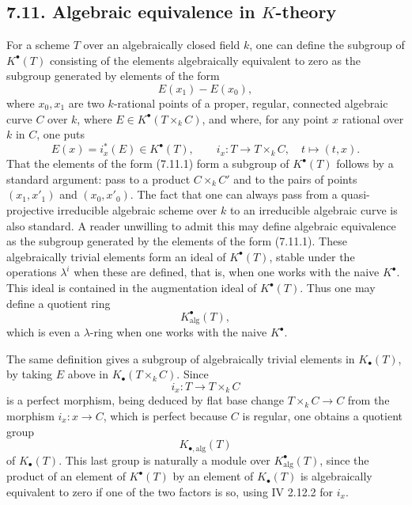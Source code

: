 \documentclass[11pt]{article}
\begin{document}
\subsection*{7.11. Algebraic equivalence in \(K\)-theory}
For a scheme \(T\) over an algebraically closed field \(k\), one can define the subgroup of \(K^\bullet(T)\) consisting of the elements algebraically equivalent to zero as the subgroup generated by elements of the form
\begin{equation}\tag{7.11.1}
  E(x_1)-E(x_0),
\end{equation}
where \(x_0,x_1\) are two \(k\)-rational points of a proper, regular, connected algebraic curve \(C\) over \(k\), where \(E\in K^\bullet(T\times_k C)\), and where, for any point \(x\) rational over \(k\) in \(C\), one puts
\[
  E(x)=i_x^*(E)\in K^\bullet(T),\qquad
  i_x:T\longrightarrow T\times_k C,\quad t\mapsto(t,x).
\]
That the elements of the form (7.11.1) form a subgroup of \(K^\bullet(T)\) follows by a standard argument: pass to a product \(C\times_k C'\) and to the pairs of points \((x_1,x'_1)\) and \((x_0,x'_0)\). The fact that one can always pass from a quasi-projective irreducible algebraic scheme over \(k\) to an irreducible algebraic curve is also standard. A reader unwilling to admit this may define algebraic equivalence as the subgroup generated by the elements of the form (7.11.1). These algebraically trivial elements form an ideal of \(K^\bullet(T)\), stable under the operations \(\lambda^i\) when these are defined, that is, when one works with the naive \(K^\bullet\). This ideal is contained in the augmentation ideal of \(K^\bullet(T)\). Thus one may define a quotient ring
\begin{equation}\tag{7.11.2}
  K^\bullet_{\mathrm{alg}}(T),
\end{equation}
which is even a \(\lambda\)-ring when one works with the naive \(K^\bullet\).

The same definition gives a subgroup of algebraically trivial elements in \(K_\bullet(T)\), by taking \(E\) above in \(K_\bullet(T\times_k C)\). Since
\[
  i_x:T\to T\times_k C
\]
is a perfect morphism, being deduced by flat base change \(T\times_k C\to C\) from the morphism \(i_x:x\to C\), which is perfect because \(C\) is regular, one obtains a quotient group
\begin{equation}\tag{7.11.3}
  K_{\bullet,\mathrm{alg}}(T)
\end{equation}
of \(K_\bullet(T)\). This last group is naturally a module over \(K^\bullet_{\mathrm{alg}}(T)\), since the product of an element of \(K^\bullet(T)\) by an element of \(K_\bullet(T)\) is algebraically equivalent to zero if one of the two factors is so, using IV 2.12.2 for \(i_x\).
\end{document}
